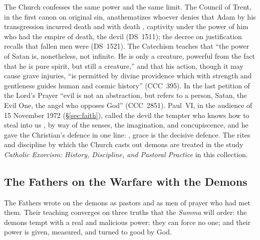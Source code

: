 The Church confesses the same power and the same limit. The Council of
Trent, in the first canon on original sin, anathematizes whoever denies that
Adam by his transgression incurred death and with death , captivity under the power of him who had the empire of death,
the devil (DS~1511); the decree on justification recalls that fallen men
were  (DS~1521). The Catechism
teaches that ``the power of Satan is, nonetheless, not infinite. He is only
a creature, powerful from the fact that he is pure spirit, but still a
creature,'' and that his action, though it may cause grave injuries, ``is
permitted by divine providence which with strength and gentleness guides
human and cosmic history'' (CCC~395). In the last petition of the Lord's
Prayer ``evil is not an abstraction, but refers to a person, Satan, the
Evil One, the angel who opposes God'' (CCC~2851). Paul~VI, in the audience
of 15 November 1972 (\S\ref{sec:faith}), called the devil the tempter
 who knows how to steal into us , by way of the senses, the
imagination, and concupiscence, and he gave the Christian's defence in one
line: , grace is the decisive defence.
The rites and discipline by which the Church casts out demons are treated
in the study \emph{Catholic Exorcism: History, Discipline, and Pastoral
Practice} in this collection.

\sectionguard
\subsection{The Fathers on the Warfare with the Demons}

The Fathers wrote on the demons as pastors and as men of prayer who had
met them. Their teaching converges on three truths that the \emph{Summa}
will order: the demons tempt with a real and malicious power; they can
force no one; and their power is given, measured, and turned to good by
God.

